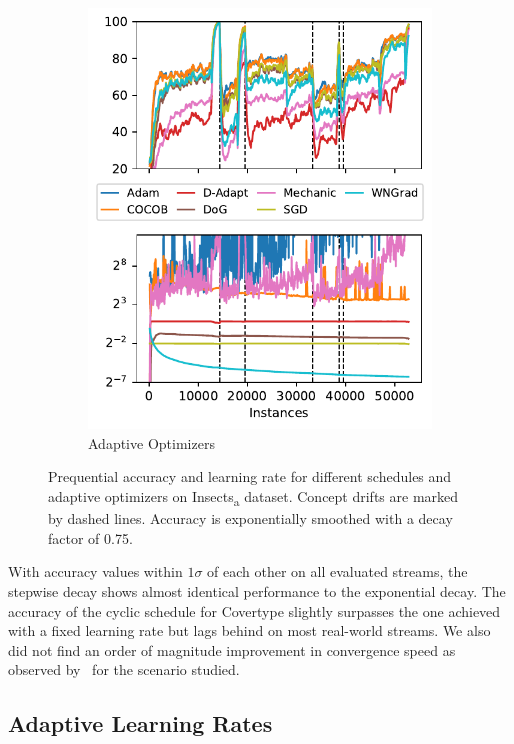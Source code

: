 \documentclass{article} %
\begin{document}
\begin{figure}[ht]
\begin{subfigure}[b]{0.99\textwidth - \asize}
      \includegraphics[width=\textwidth]{figures/lr_norms_optims_insects_abrupt.pdf}
      \caption{Adaptive Optimizers}
      \label{fig:prequential_optims_insects}
   \end{subfigure}
   \caption{Prequential accuracy and learning rate for different schedules and adaptive optimizers on Insects\textsubscript{a} dataset. Concept drifts are marked by dashed lines. Accuracy is exponentially smoothed with a decay factor of 0.75.}
\end{figure}

With accuracy values within $1\sigma$ of each other on all evaluated streams, the stepwise decay shows almost identical performance to the exponential decay.
The accuracy of the cyclic schedule for Covertype slightly surpasses the one achieved with a fixed learning rate but lags behind on most real-world streams.
We also did not find an order of magnitude improvement in convergence speed as observed by~\citep{smithSuperConvergenceVeryFast2018a} for the scenario studied.


\subsection{Adaptive Learning Rates}
\end{document}
